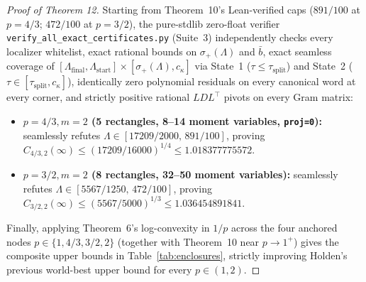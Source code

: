 \documentclass[10pt,letterpaper]{article}
\begin{document}
\begin{proof}[Proof of Theorem 12]
Starting from Theorem~10's Lean-verified caps ($891/100$ at $p = 4/3$; $472/100$ at $p = 3/2$), the pure-stdlib zero-float verifier \texttt{verify\_all\_exact\_certificates.py} (Suite~3) independently checks every localizer whitelist, exact rational bounds on $\sigma_+(\Lambda)$ and $\bar{b}$, exact seamless coverage of $[\Lambda_{\mathrm{final}}, \Lambda_{\mathrm{start}}] \times [\sigma_+(\Lambda), c_\kappa]$ via State~1 ($\tau \le \tau_{\mathrm{split}}$) and State~2 ($\tau \in [\tau_{\mathrm{split}}, c_\kappa]$), identically zero polynomial residuals on every canonical word at every corner, and strictly positive rational $LDL^\top$ pivots on every Gram matrix:
\begin{itemize}[leftmargin=1.5em,itemsep=1.5pt]
  \item \textbf{$p = 4/3, m = 2$ (5 rectangles, 8--14 moment variables, \texttt{proj=0}):} seamlessly refutes $\Lambda \in [17209/2000,\, 891/100]$, proving $C_{4/3,2}(\infty) \le (17209/16000)^{1/4} \le 1.018377775572$.
  \item \textbf{$p = 3/2, m = 2$ (8 rectangles, 32--50 moment variables):} seamlessly refutes $\Lambda \in [5567/1250,\, 472/100]$, proving $C_{3/2,2}(\infty) \le (5567/5000)^{1/3} \le 1.036454891841$.
\end{itemize}
Finally, applying Theorem~6's log-convexity in $1/p$ across the four anchored nodes $p \in \{1, 4/3, 3/2, 2\}$ (together with Theorem~10 near $p \to 1^+$) gives the composite upper bounds in Table~\ref{tab:enclosures}, strictly improving Holden's previous world-best upper bound for every $p \in (1, 2)$.
\end{proof}
\end{document}
